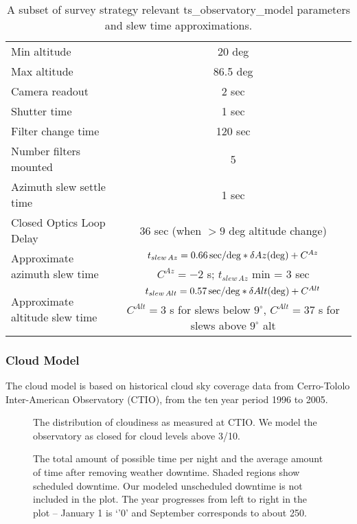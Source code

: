 \begin{table}[b]
\begin{centering}
\begin{tabular}{lc}
\toprule
Min altitude  & 20 deg \\
Max altitude & 86.5 deg \\
Camera readout & 2 sec\\
Shutter time & 1 sec \\
Filter change time & 120 sec \\
Number filters mounted & 5 \\
Azimuth slew settle time & 1 sec \\
Closed Optics Loop Delay & 36 sec (when $>9$ deg altitude change) \\
\multirow{2}{*}{Approximate azimuth slew time} &   $ t_{slew \, Az} = 0.66 \, {\rm sec/deg} * \delta Az ({\rm deg}) + C^{Az} $  \\
   &   $C^{Az} = -2$ s;   $t_{slew \, Az}$  min = 3 sec \\
\multirow{2}{*}{Approximate altitude slew time}  &  $  t_{slew \, Alt} = 0.57 \, {\rm sec/deg} * \delta Alt ({\rm deg}) + C^{Alt} $ \\
   & $C^{Alt} = 3$ s for slews below $9^\circ$, $C^{Alt} = 37$ s for slews above $9^\circ$ alt \\
\hline
\end{tabular}
\caption{A subset of survey strategy relevant ts\_observatory\_model parameters and slew time approximations.}
\label{tab:tsModel}
\end{centering}
\end{table}

\subsubsection{Cloud Model}

The cloud model is based on historical cloud sky coverage data from Cerro-Tololo Inter-American Observatory (CTIO), from the ten year period 1996 to 2005. 

\begin{figure}
\caption{The distribution of cloudiness as measured at CTIO. We model the observatory as closed for cloud levels above 3/10.}
\end{figure}

\begin{figure}
\caption{The total amount of possible time per night and the average amount of time after removing weather downtime. Shaded regions show scheduled downtime. Our modeled unscheduled downtime is not included in the plot. The year progresses from left to right in the plot -- January 1 is `'0' and September corresponds to about 250.}
\end{figure}

